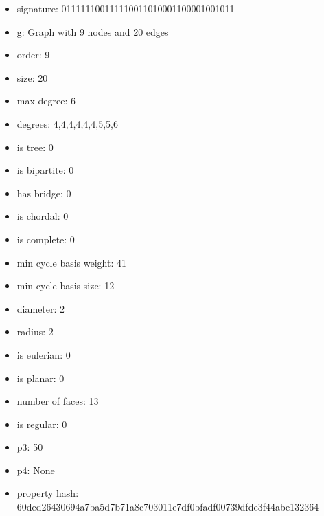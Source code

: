 \newpage
\begin{figure}
\end{figure}
\begin{itemize}
\item signature: 011111100111110011010001100001001011
\item g: Graph with 9 nodes and 20 edges
\item order: 9
\item size: 20
\item max degree: 6
\item degrees: 4,4,4,4,4,4,5,5,6
\item is tree: 0
\item is bipartite: 0
\item has bridge: 0
\item is chordal: 0
\item is complete: 0
\item min cycle basis weight: 41
\item min cycle basis size: 12
\item diameter: 2
\item radius: 2
\item is eulerian: 0
\item is planar: 0
\item number of faces: 13
\item is regular: 0
\item p3: 50
\item p4: None
\item property hash: 60ded26430694a7ba5d7b71a8c703011e7df0bfadf00739dfde3f44abe132364
\end{itemize}
